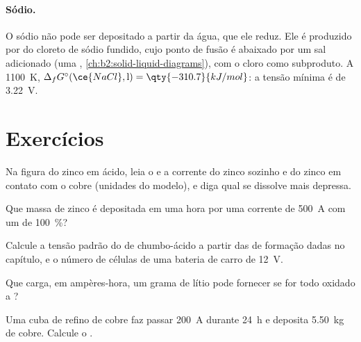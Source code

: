 \paragraph{Sódio.} O sódio não pode ser depositado a partir da água, que ele
reduz. Ele é produzido por  do cloreto de sódio fundido, cujo ponto
de fusão é abaixado por um sal adicionado (uma ,
\cref{ch:b2:solid-liquid-diagrams}), com o cloro como subproduto. A
\qty{1100}{K}, $\Delta_f G^\circ(\ce{NaCl}, \text{l}) =
\qty{-310.7}{kJ/mol}$: a tensão mínima é de \qty{3.22}{V}.

\section{Exercícios}

\begin{exercise}[$\star$]\label{exo:b2:batteries-electrolysis:1}
Na figura do zinco em ácido, leia o  e a corrente do zinco
sozinho e do zinco em contato com o cobre (unidades do modelo), e diga qual
se dissolve mais depressa.
\end{exercise}

\begin{exercise}[$\star$]\label{exo:b2:batteries-electrolysis:2}
Que massa de zinco é depositada em uma hora por uma corrente de \qty{500}{A}
com um  de 100~\%?
\end{exercise}

\begin{exercise}[$\star$]\label{exo:b2:batteries-electrolysis:3}
Calcule a tensão padrão do  de chumbo-ácido a partir das  de formação dadas no capítulo, e o número de células de uma bateria
de carro de \qty{12}{V}.
\end{exercise}

\begin{exercise}[$\star$]\label{exo:b2:batteries-electrolysis:4}
Que carga, em ampères-hora, um grama de lítio pode fornecer se for todo
oxidado a ?
\end{exercise}

\begin{exercise}[$\star\star$]\label{exo:b2:batteries-electrolysis:5}
Uma cuba de refino de cobre faz passar \qty{200}{A} durante \qty{24}{h} e
deposita \qty{5.50}{kg} de cobre. Calcule o .
\end{exercise}

